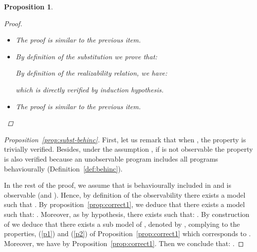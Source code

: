 \documentclass{eptcs}
\newtheorem{proposition}{Proposition}
\newcommand{\ie}[0]{\abbrev{\textit{i.e.}}}
\newcounter{ti}
\begin{document}
\begin{proposition}
\begin{proof}
\begin{itemize}
which implies the initial property.

\item  The proof is similar to the previous item.
\item 
By definition of the substitution we prove that: 


By definition of the realizability relation, we have: 

which is directly verified by induction hypothesis.
\item  
The proof is similar to the previous item.
\end{itemize}
\end{proof}
\end{proposition}

\begin{proof}[Proposition~\ref{prop:subst-behinc}]
First, let us remark that when , the property is trivially verified.
Besides, under the assumption , if  is not observable the property is also verified because an unobservable program includes all programs behaviourally (Definition~\ref{def:behinc}).

In the rest of the proof, we assume that  is behaviourally included in  and  is observable (\ie  and ).
Hence, by definition of the observability there exists a model  such that . By proposition~\ref{prop:correct1}, we deduce that there exists a model  such that: . Moreover, as  by hypothesis, there exists  such that: . By construction of  we deduce that there exists a sub model of , denoted by , complying to the properties, (\ref{p1}) and (\ref{p2}) of Proposition~\ref{prop:correct1} which corresponds to . Moreover, we have  by Proposition~\ref{prop:correct1}. Then we conclude that: .
\end{proof}
\end{document}
